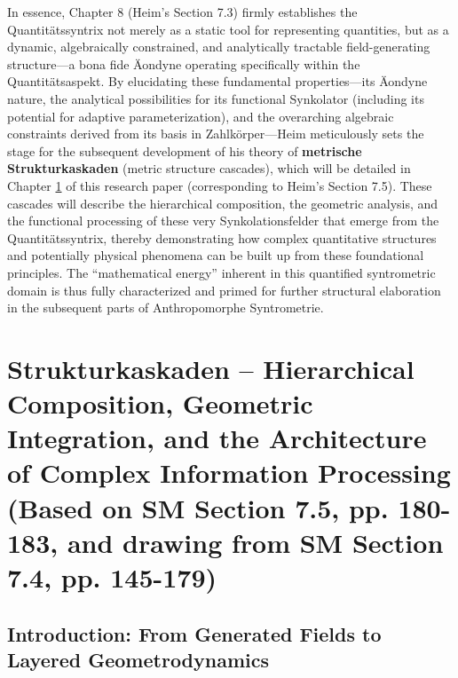 \documentclass[
    12pt,              %
    a4paper,           %
    headings=normal,   %
    twoside=true,      %
    BCOR=8mm,          %
]{scrbook}
\newcommand{\q}[1]{\enquote{#1}}
\begin{document}
In essence, Chapter 8 (Heim’s Section 7.3) firmly establishes the Quantitätssyntrix not merely as a static tool for representing quantities, but as a dynamic, algebraically constrained, and analytically tractable field-generating structure—a bona fide Äondyne operating specifically within the Quantitätsaspekt. By elucidating these fundamental properties—its Äondyne nature, the analytical possibilities for its functional Synkolator (including its potential for adaptive parameterization), and the overarching algebraic constraints derived from its basis in Zahlkörper—Heim meticulously sets the stage for the subsequent development of his theory of \textbf{metrische Strukturkaskaden} (metric structure cascades), which will be detailed in Chapter \ref{sec:chapter9} of this research paper (corresponding to Heim’s Section 7.5). These cascades will describe the hierarchical composition, the geometric analysis, and the functional processing of these very Synkolationsfelder that emerge from the Quantitätssyntrix, thereby demonstrating how complex quantitative structures and potentially physical phenomena can be built up from these foundational principles. The \q{mathematical energy} inherent in this quantified syntrometric domain is thus fully characterized and primed for further structural elaboration in the subsequent parts of Anthropomorphe Syntrometrie.

\clearpage

\chapter{Strukturkaskaden – Hierarchical Composition, Geometric Integration, and the Architecture of Complex Information Processing (Based on SM Section 7.5, pp. 180-183, and drawing from SM Section 7.4, pp. 145-179)}
\label{sec:chapter9} %

\section{Introduction: From Generated Fields to Layered Geometrodynamics}
\label{sec:ch9_0_intro}
\end{document}
